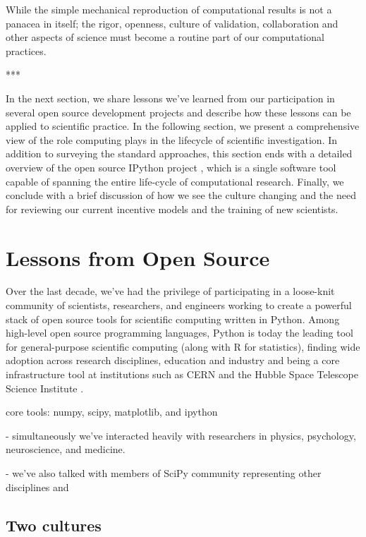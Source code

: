\documentclass[ChapterTOCs,krantz2]{krantz} %
\newcommand{\parasep}{\begin{center}*\hspace{6em}*\hspace{6em}*\end{center}}
\begin{document}
While the simple mechanical reproduction of computational results is not a
panacea in itself; the rigor, openness, culture of validation, collaboration and
other aspects of science must become a routine part of our computational practices.

\parasep

In the next section, we share lessons we've learned from our participation in
several open source development projects and describe how these lessons can be
applied to scientific practice.  In the following section, we present a
comprehensive view of the role computing plays in the lifecycle of scientific
investigation.  In addition to surveying the standard approaches, this section
ends with a detailed overview of the open source IPython project
\cite{PER-GRA:2007}, which is a single software tool capable of spanning the
entire life-cycle of computational research.  Finally, we conclude with a brief
discussion of how we see the culture changing and the need for reviewing our
current incentive models and the training of new scientists. 

\section{Lessons from Open Source}

Over the last decade, we've had the privilege of participating in a loose-knit
community of scientists, researchers, and engineers working to create a powerful
stack of open source tools for scientific computing written in Python.  Among
high-level open source programming languages, Python is today the leading tool
for general-purpose scientific computing (along with R for statistics),
finding wide adoption across research disciplines, education and industry and
being a core infrastructure tool at institutions such as CERN and the Hubble
Space Telescope Science Institute
\cite{millman2011python,Perez2011,ganga09,SST}.

core tools: numpy, scipy, matplotlib, and ipython

- simultaneously we've interacted heavily with researchers in
physics, psychology, neuroscience, and medicine.

- we've also talked with members of SciPy community representing
other disciplines and 


\subsection{Two cultures}
\end{document}
